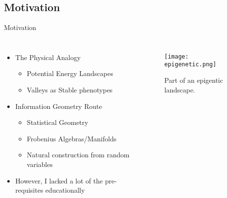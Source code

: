 \documentclass[aspectratio=169, onlytextwidth,  notheorems, sOuRcEs, fleqn, leqno, ]{RUCPresentation}
\begin{document}
\subsection{ Motivation }
\begin{frame}{ Motivation }

    \begin{columns}

        \column{0.45\framewidth}
        \begin{itemize}[<+->]
            \item The Physical Analogy
                \begin{itemize}[<.->]
                    \item Potential Energy Landscapes
                    \item Valleys as Stable phenotypes
                \end{itemize}
            \item Information Geometry Route
                \begin{itemize}[<.->]
                    \item Statistical Geometry %
                    \item Frobenius Algebras/Manifolds%
                    \item Natural construction from random variables
                \end{itemize}
            \item However, I lacked a lot of the pre-requisites educationally
        \end{itemize}


        \column{0.60\framewidth}

        \begin{figure}[htbp]
        \centering
        \texttt{[image: epigenetic.png]}
        \caption{Part of an epigentic landscape.}
        \end{figure}




    \end{columns}


\end{frame}
\end{document}
